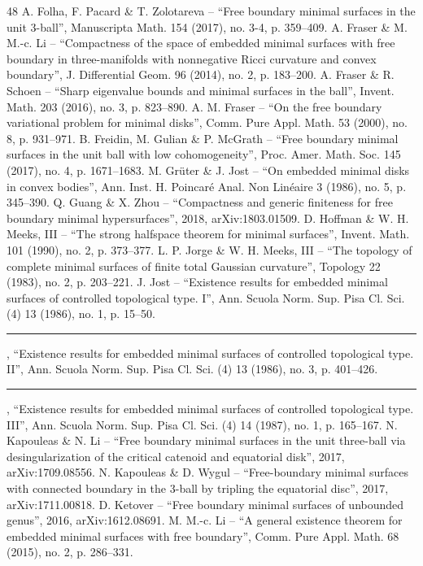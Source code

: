 \begin{thebibliography}{48}
 A. Folha, F. Pacard \& T. Zolotareva – “Free boundary minimal surfaces in the unit 3-ball”, Manuscripta Math. 154 (2017), no. 3-4, p. 359–409.
 A. Fraser \& M. M.-c. Li – “Compactness of the space of embedded minimal surfaces with free boundary in three-manifolds with nonnegative Ricci curvature and convex boundary”, J. Differential Geom. 96 (2014), no. 2, p. 183–200.
 A. Fraser \& R. Schoen – “Sharp eigenvalue bounds and minimal surfaces in the ball”, Invent. Math. 203 (2016), no. 3, p. 823–890.
 A. M. Fraser – “On the free boundary variational problem for minimal disks”, Comm. Pure Appl. Math. 53 (2000), no. 8, p. 931–971.
 B. Freidin, M. Gulian \& P. McGrath – “Free boundary minimal surfaces in the unit ball with low cohomogeneity”, Proc. Amer. Math. Soc. 145 (2017), no. 4, p. 1671–1683.
 M. Grüter \& J. Jost – “On embedded minimal disks in convex bodies”, Ann. Inst. H. Poincaré Anal. Non Linéaire 3 (1986), no. 5, p. 345–390.
 Q. Guang \& X. Zhou – “Compactness and generic ﬁniteness for free boundary minimal hypersurfaces”, 2018, arXiv:1803.01509.
 D. Hoffman \& W. H. Meeks, III – “The strong halfspace theorem for minimal surfaces”, Invent. Math. 101 (1990), no. 2, p. 373–377.
 L. P. Jorge \& W. H. Meeks, III – “The topology of complete minimal surfaces of ﬁnite total Gaussian curvature”, Topology 22 (1983), no. 2, p. 203–221.
 J. Jost – “Existence results for embedded minimal surfaces of controlled topological type. I”, Ann. Scuola Norm. Sup. Pisa Cl. Sci. (4) 13 (1986), no. 1, p. 15–50.
 \rule{2em}{.3pt} , “Existence results for embedded minimal surfaces of controlled topological type. II”, Ann. Scuola Norm. Sup. Pisa Cl. Sci. (4) 13 (1986), no. 3, p. 401–426.
 \rule{2em}{.3pt} , “Existence results for embedded minimal surfaces of controlled topological type. III”, Ann. Scuola Norm. Sup. Pisa Cl. Sci. (4) 14 (1987), no. 1, p. 165–167.
 N. Kapouleas \& N. Li – “Free boundary minimal surfaces in the unit three-ball via desingularization of the critical catenoid and equatorial disk”, 2017, arXiv:1709.08556.
 N. Kapouleas \& D. Wygul – “Free-boundary minimal surfaces with connected boundary in the 3-ball by tripling the equatorial disc”, 2017, arXiv:1711.00818.
 D. Ketover – “Free boundary minimal surfaces of unbounded genus”, 2016, arXiv:1612.08691.
 M. M.-c. Li – “A general existence theorem for embedded minimal surfaces with free boundary”, Comm. Pure Appl. Math. 68 (2015), no. 2, p. 286–331.

\end{thebibliography}
